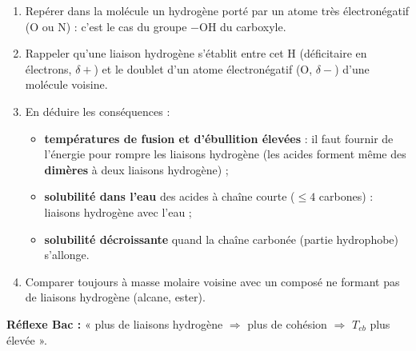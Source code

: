 \documentclass[11pt]{article}
\newcommand{\cle}[1]{{\popxbold\color{popdark}#1}}
\begin{document}
\begin{methode}
\begin{enumerate}
\item Repérer dans la molécule un hydrogène porté par un atome très électronégatif (O ou N) : c'est le cas du groupe $-\mathrm{OH}$ du carboxyle.
\item Rappeler qu'une \cle{liaison hydrogène} s'établit entre cet H (déficitaire en électrons, $\delta+$) et le doublet d'un atome électronégatif (O, $\delta-$) d'une molécule voisine.
\item En déduire les conséquences :
\begin{itemize}
\item \textbf{températures de fusion et d'ébullition élevées} : il faut fournir de l'énergie pour rompre les liaisons hydrogène (les acides forment même des \textbf{dimères} à deux liaisons hydrogène) ;
\item \textbf{solubilité dans l'eau} des acides à chaîne courte ($\leq 4$ carbones) : liaisons hydrogène avec l'eau ;
\item \textbf{solubilité décroissante} quand la chaîne carbonée (partie hydrophobe) s'allonge.
\end{itemize}
\item Comparer toujours à masse molaire voisine avec un composé ne formant pas de liaisons hydrogène (alcane, ester).
\end{enumerate}
\textbf{Réflexe Bac :} « plus de liaisons hydrogène $\Rightarrow$ plus de cohésion $\Rightarrow$ $T_{eb}$ plus élevée ».
\end{methode}
\end{document}
